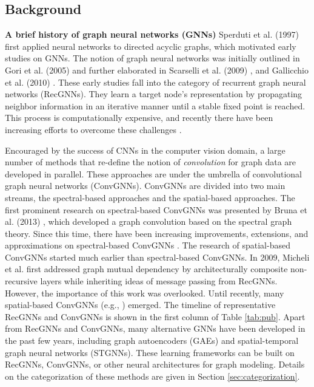 \subsection{Background}

\vspace{2mm}
\textbf{A brief history of graph neural networks (GNNs)} Sperduti et al. (1997) \cite{sperduti1997supervised} first applied neural networks to directed acyclic graphs, which motivated early studies on GNNs. The notion of graph neural networks was initially outlined in Gori et al. (2005) \cite{gori2005new} and further elaborated in Scarselli et al. (2009) \cite{scarselli2009graph}, and Gallicchio et al. (2010) \cite{gallicchio2010graph}. 
These early studies fall into the category of recurrent graph neural networks (RecGNNs). They learn a target node's representation by propagating neighbor information in an iterative manner until a stable fixed point is reached. 
This process is computationally expensive, and recently there have been increasing efforts to overcome these challenges \cite{li2015gated,dai2018learning}. 

Encouraged by the success of CNNs in the computer vision domain, a large number of methods that re-define the notion of \textit{convolution} for graph data are developed in parallel. These approaches are under the umbrella of convolutional graph neural networks (ConvGNNs). ConvGNNs are divided into two main streams, the spectral-based approaches and the spatial-based approaches.  The first prominent research on spectral-based ConvGNNs was presented by Bruna et al. (2013) \cite{bruna2013spectral}, which developed a graph convolution based on the spectral graph theory.  Since this time, there have been increasing improvements, extensions, and approximations on spectral-based ConvGNNs \cite{henaff2015deep, defferrard2016convolutional, kipf2017semi, levie2017cayleynets}.  The research of spatial-based ConvGNNs started much earlier than spectral-based ConvGNNs. In 2009, Micheli et al. \cite{micheli2009neural} first addressed graph mutual dependency by architecturally composite non-recursive layers while inheriting ideas of message passing from RecGNNs.  However,  the importance of this work was overlooked. Until recently, many spatial-based ConvGNNs (e.g., \cite{atwood2016diffusion,niepert2016learning,gilmer2017neural}) emerged. %
The timeline of representative RecGNNs and ConvGNNs is shown in the first column of Table \ref{tab:pub}.
Apart from RecGNNs and ConvGNNs, many alternative GNNs have been developed in the past few years, including graph autoencoders (GAEs) and  spatial-temporal graph neural networks (STGNNs). These learning frameworks can be built on RecGNNs, ConvGNNs, or other neural architectures for graph modeling. 
Details on the categorization of these methods are given in Section \ref{sec:categorization}. 
	

